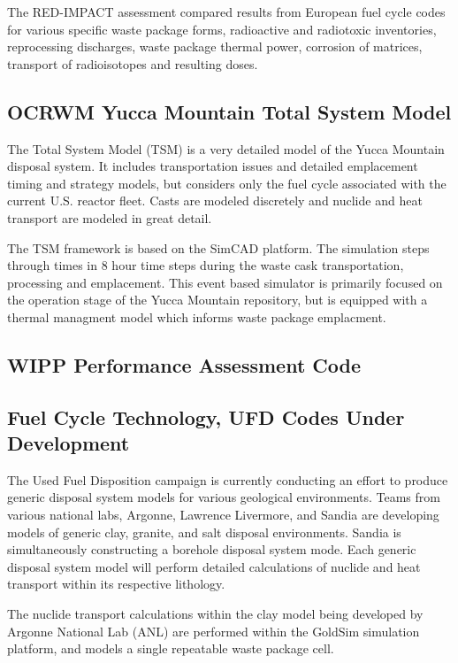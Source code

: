 The RED-IMPACT assessment compared results from European fuel cycle 
codes for various specific waste package forms, radioactive and 
radiotoxic inventories, reprocessing discharges,  waste package 
thermal power, corrosion of matrices, transport of radioisotopes and 
resulting doses.


\subsection{OCRWM Yucca Mountain Total System Model}
The Total System Model (TSM) is a very detailed 
model of the Yucca Mountain disposal system. It includes 
transportation issues and detailed emplacement timing and strategy 
models, but considers only the fuel cycle associated with the current  
U.S. reactor fleet. Casts are modeled discretely and nuclide and heat 
transport are modeled in great detail. 

The TSM framework is based on the SimCAD platform. The 
simulation steps through times in 8 hour time steps during the waste 
cask transportation, processing and emplacement. This event based 
simulator is primarily focused on the operation stage of the Yucca 
Mountain repository, but is equipped with a thermal managment model 
which informs waste package emplacment.

\subsection{WIPP Performance Assessment Code}

\subsection{Fuel Cycle Technology, UFD Codes Under Development}

The Used Fuel Disposition campaign is currently conducting an effort 
to produce generic disposal system models for various geological 
environments. Teams from various national labs, Argonne, Lawrence 
Livermore, and Sandia are developing models of generic clay, granite,   
and salt disposal environments. Sandia is simultaneously constructing  
a borehole disposal system mode. Each generic disposal system model 
will perform detailed calculations of nuclide  and heat transport 
within its respective lithology. 

The nuclide transport calculations within the  clay model being 
developed by Argonne National Lab (ANL) are performed within the 
GoldSim simulation platform, and models a single repeatable waste 
package cell. 

